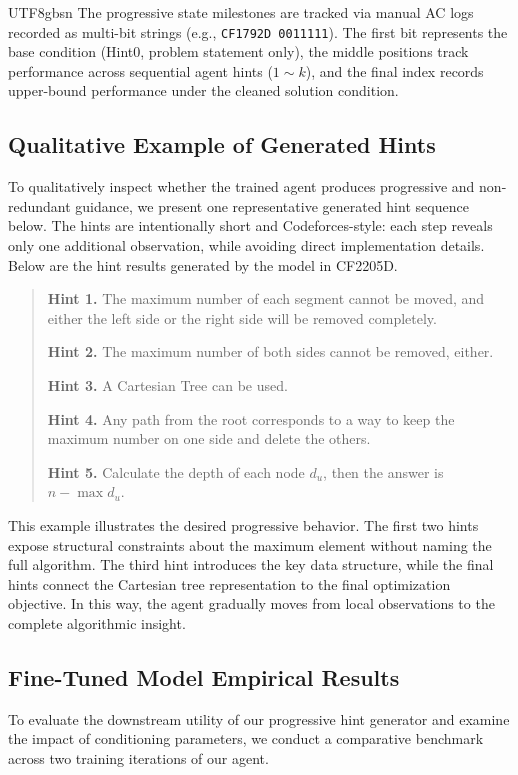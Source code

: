 \documentclass{article}
\begin{document}
\begin{CJK*}{UTF8}{gbsn}
The progressive state milestones are tracked via manual AC logs recorded as multi-bit strings (e.g., \texttt{CF1792D 0011111}). The first bit represents the base condition (Hint0, problem statement only), the middle positions track performance across sequential agent hints ($1 \sim k$), and the final index records upper-bound performance under the cleaned solution condition.


\subsection{Qualitative Example of Generated Hints}

To qualitatively inspect whether the trained agent produces progressive and non-redundant guidance, we present one representative generated hint sequence below. The hints are intentionally short and Codeforces-style: each step reveals only one additional observation, while avoiding direct implementation details. Below are the hint results generated by the model in CF2205D.

\begin{quote}
\textbf{Hint 1.}
The maximum number of each segment cannot be moved, and either the left side or the right side will be removed completely.

\textbf{Hint 2.}
The maximum number of both sides cannot be removed, either.

\textbf{Hint 3.}
A Cartesian Tree can be used.

\textbf{Hint 4.}
Any path from the root corresponds to a way to keep the maximum number on one side and delete the others.

\textbf{Hint 5.}
Calculate the depth of each node $d_u$, then the answer is $n - \max d_u$.
\end{quote}

This example illustrates the desired progressive behavior. The first two hints expose structural constraints about the maximum element without naming the full algorithm. The third hint introduces the key data structure, while the final hints connect the Cartesian tree representation to the final optimization objective. In this way, the agent gradually moves from local observations to the complete algorithmic insight.



\subsection{Fine-Tuned Model Empirical Results}
To evaluate the downstream utility of our progressive hint generator and examine the impact of conditioning parameters, we conduct a comparative benchmark across two training iterations of our agent. 


\end{CJK*}
\end{document}
